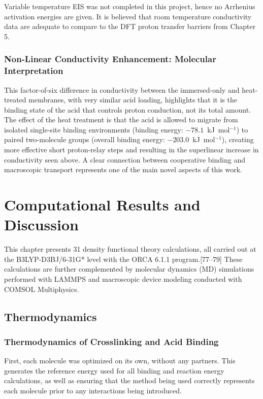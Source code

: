\documentclass[12pt,a4paper]{report}
\begin{document}
Variable temperature EIS was not completed in this project, hence no Arrhenius activation energies are given. It is believed that room temperature conductivity data are adequate to compare to the DFT proton transfer barriers from Chapter 5.

\subsection{Non‑Linear Conductivity Enhancement: Molecular Interpretation}

This factor-of-six difference in conductivity between the immersed-only and heat-treated membranes, with very similar acid loading, highlights that it is the binding state of the acid that controls proton conduction, not its total amount. The effect of the heat treatment is that the acid is allowed to migrate from isolated single-site binding environments (binding energy: $-78.1$~kJ~mol$^{-1}$) to paired two-molecule groups (overall binding energy: $-203.0$~kJ~mol$^{-1}$), creating more effective short proton-relay steps and resulting in the superlinear increase in conductivity seen above. A clear connection between cooperative binding and macroscopic transport represents one of the main novel aspects of this work.

\chapter{Computational Results and Discussion}

This chapter presents 31 density functional theory calculations, all carried out at the B3LYP-D3BJ/6-31G* level with the ORCA 6.1.1 program.[77–79] These calculations are further complemented by molecular dynamics (MD) simulations performed with LAMMPS and macroscopic device modeling conducted with COMSOL Multiphysics. 
\section{Thermodynamics}
\subsection{Thermodynamics of Crosslinking and Acid Binding}
First, each molecule was optimized on its own, without any partners. This generates the reference energy used for all binding and reaction energy calculations, as well as ensuring that the method being used correctly represents each molecule prior to any interactions being introduced.
\end{document}
